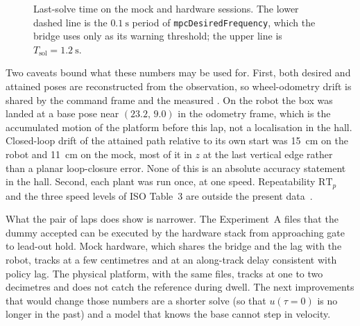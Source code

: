 \begin{figure}[htbp]
  \centering
  \caption[Last-solve time on the mock and hardware sessions]{%
    Last-solve time on the mock and hardware sessions. The lower dashed
    line is the $\qty{0.1}{\second}$ period of \texttt{mpcDesiredFrequency},
    which the bridge uses only as its warning threshold; the upper line is
    $T_{\mathrm{sol}}=\qty{1.2}{\second}$.}
  \label{fig:hw-solve}
\end{figure}

Two caveats bound what these numbers may be used for. First, both
desired and attained poses are reconstructed from the \mpc{} observation,
so wheel-odometry drift is shared by the command frame and the measured
\ee{}. On the robot the box was landed at a base pose near
$(23.2,\,9.0)$ in the odometry frame, which is the accumulated motion of
the platform before this lap, not a localisation in the hall. Closed-loop
drift of the attained path relative to its own start was
\qty{15}{\centi\meter} on the robot and \qty{11}{\centi\meter} on the
mock, most of it in $z$ at the last vertical edge rather than a planar
loop-closure error. None of this is an absolute accuracy statement in
the hall. Second, each plant was run once, at one speed. Repeatability
$\mathrm{RT}_{p}$ and the three speed levels of ISO Table~3 are outside
the present data~\cite{ISO9283}.

What the pair of laps does show is narrower. The Experiment~A files that
the dummy accepted can be executed by the hardware stack from approaching
gate to lead-out hold. Mock hardware, which shares the bridge and the
lag with the robot, tracks at a few centimetres and at an along-track
delay consistent with policy lag. The physical platform, with the same
files, tracks at one to two decimetres and does not catch the reference
during dwell. The next improvements that would change those numbers are
a shorter solve (so that $u(\tau=0)$ is no longer in the past) and a
model that knows the base cannot step in velocity.
